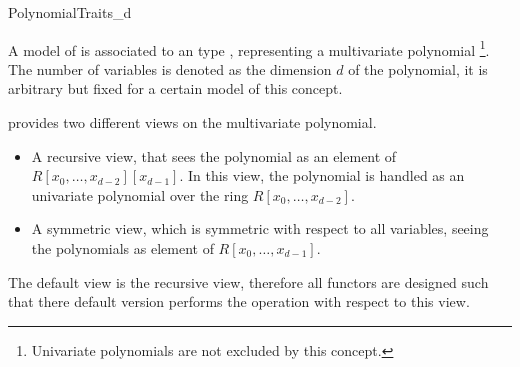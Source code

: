 \begin{ccRefConcept}{PolynomialTraits_d}

\ccDefinition
A model of  is associated to an type 
, representing a multivariate polynomial
\footnote{Univariate polynomials are not excluded by this concept.}. 
The number of variables is denoted as the dimension $d$ of the polynomial,
it is arbitrary but fixed for a certain model of this concept.  

 provides two different views on the 
multivariate polynomial. 

\begin{itemize}
\item A recursive view, that sees the polynomial as an element of 
$R[x_0,\dots,x_{d-2}][x_{d-1}]$. In this view, the polynomial is handled as
an univariate polynomial over the ring $R[x_0,\dots,x_{d-2}]$. 
\item A symmetric view, which is symmetric with respect to all variables,
seeing the polynomials as element of $R[x_0,\dots,x_{d-1}]$.
\end{itemize}


The default view is the recursive view, therefore all functors are 
designed such that there default version performs the operation 
with respect to this view. 

\ccRefines

\ccConstants
 

\ccTypes

\ccGlue
{}\ccGlue
{}







\end{ccRefConcept}
